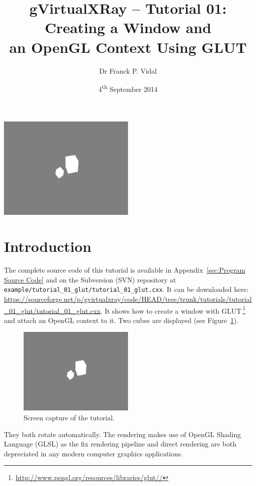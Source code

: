\documentclass[11pt,oneside,a4paper,final]{article}
\title{gVirtualXRay -- Tutorial 01: Creating a Window and\\an OpenGL Context Using GLUT}
\author{Dr Franck P. Vidal}
\date{4\textsuperscript{th} September 2014}
\begin{document}
 \sloppy

\maketitle
\vfill
\begin{center}
\includegraphics[width=0.5\textwidth]{screenshot}
\end{center}
\vfill


 \newpage
{}
{}
\tableofcontents

\ifpdf
\newpage
{}
{}
\listoffigures


{}
{}
\lstlistoflistings
\fi

\newpage


\section{Introduction}

The complete source code of this tutorial is available in 
Appendix~\ref{sec:Program Source Code} and on the Subversion (SVN) repository 
at 
\verb+example/tutorial_01_glut/tutorial_01_glut.cxx+. 
It can be downloaded here: 
\url{
https://sourceforge.net/p/gvirtualxray/code/HEAD/tree/trunk/tutorials/tutorial_01_glut/tutorial_01_glut.cxx}. 
It shows how to create a window with GLUT\,\footnote{\url{http://www.pengl.org/resources/libraries/glut//}} 
and attach an OpenGL context to it. 
Two cubes are displayed (see Figure~\ref{fig:scene}). 
\begin{figure}[tbh]
 \centering
 \includegraphics[width=0.5\textwidth]{screenshot}
 \caption{\label{fig:scene} Screen capture of the tutorial.}
\end{figure}
They both rotate automatically. 
The rendering makes use of OpenGL Shading Language (GLSL) as the fix rendering 
pipeline and direct 
rendering are both depreciated in any modern computer graphics applications. 
\end{document}
